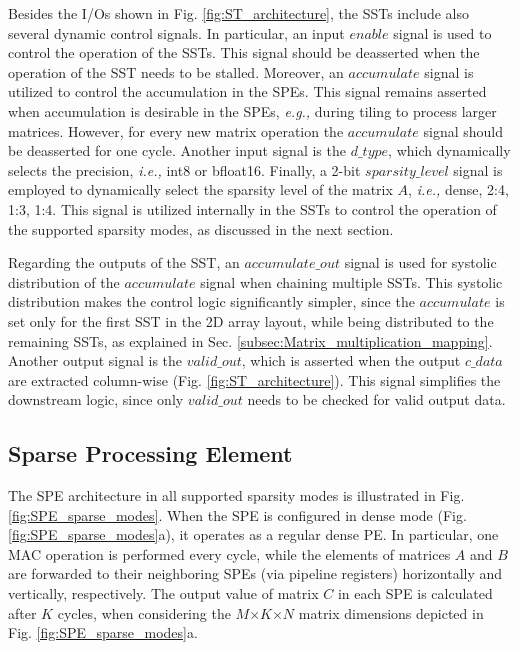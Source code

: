 Besides the I/Os shown in Fig. \ref{fig:ST_architecture}, the SSTs include also several dynamic control signals.
In particular, an input $enable$ signal is used to control the operation of the SSTs.
This signal should be deasserted when the operation of the SST needs to be stalled.
Moreover, an $accumulate$ signal is utilized to control the accumulation in the SPEs.
This signal remains asserted when accumulation is desirable in the SPEs, \emph{e.g.,} during tiling to process larger matrices.
However, for every new matrix operation the $accumulate$ signal should be deasserted for one cycle.
Another input signal is the  $d\_type$, which  dynamically selects the precision, \emph{i.e.,} int8 or bfloat16.
Finally, a 2-bit $sparsity\_level$ signal is employed to dynamically select the sparsity level of the matrix $A$, \emph{i.e.,} dense, 2:4, 1:3, 1:4.
This signal is utilized internally in the SSTs to control the operation of the supported sparsity modes, as discussed in the next section.

Regarding the outputs of the SST, an $accumulate\_out$ signal is used for systolic distribution of the $accumulate$ signal when chaining multiple SSTs.
This systolic distribution makes the control logic significantly simpler, since the $accumulate$ is set only for the first SST in the 2D array layout, while being distributed to the remaining SSTs, as explained in Sec. \ref{subsec:Matrix_multiplication_mapping}.
Another output signal is the $valid\_out$, which is asserted when the output $c\_data$ are extracted column-wise (Fig. \ref{fig:ST_architecture}). 
This signal simplifies the downstream logic, since only $valid\_out$ needs to be checked for valid output data.





\subsection{Sparse Processing Element}
\label{subsec:Sparse_Processing_Element}

The SPE architecture in all supported sparsity modes is illustrated in Fig. \ref{fig:SPE_sparse_modes}.
When the SPE is configured in dense mode (Fig. \ref{fig:SPE_sparse_modes}a), it operates as a regular dense PE.
In particular, one MAC operation is performed every cycle, while the elements of matrices $A$ and $B$ are forwarded to their neighboring SPEs (via pipeline registers) horizontally and vertically, respectively.
The output value of matrix $C$ in each SPE is calculated after $K$ cycles, when considering the $M$$\times$$K$$\times$$N$ matrix dimensions depicted in Fig. \ref{fig:SPE_sparse_modes}a.




